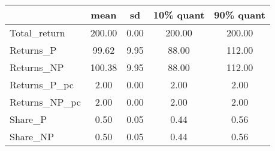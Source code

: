 \begin{tabular}{lcccc}
\toprule
{} &    mean &    sd &  10\% quant &  90\% quant \\
\midrule
Total\_return  &  200.00 &  0.00 &     200.00 &     200.00 \\
Returns\_P     &   99.62 &  9.95 &      88.00 &     112.00 \\
Returns\_NP    &  100.38 &  9.95 &      88.00 &     112.00 \\
Returns\_P\_pc  &    2.00 &  0.00 &       2.00 &       2.00 \\
Returns\_NP\_pc &    2.00 &  0.00 &       2.00 &       2.00 \\
Share\_P       &    0.50 &  0.05 &       0.44 &       0.56 \\
Share\_NP      &    0.50 &  0.05 &       0.44 &       0.56 \\
\bottomrule
\end{tabular}
